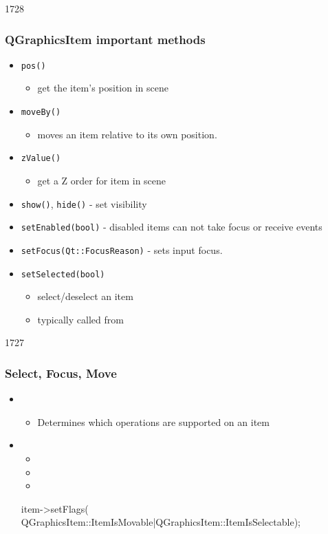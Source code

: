 \begin{slide}{1728}
\frametitle{QGraphicsItem important methods}
\begin{itemize}

\item \texttt{pos()}
    \begin{itemize}
    \item get the item's position in scene
    \end{itemize}
\item \texttt{moveBy()}
    \begin{itemize}
    \item moves an item relative to its own position. 
    \end{itemize}
\item \texttt{zValue()}
    \begin{itemize}
    \item get a Z order for item in scene
    \end{itemize}
           
\item \texttt{show()}, \texttt{hide()} - set visibility
\item \texttt{setEnabled(bool)} - disabled items can not take focus or receive events
\item \texttt{setFocus(Qt::FocusReason)} - sets input focus.
\item \texttt{setSelected(bool)}
    \begin{itemize}
    \item select/deselect an item
    \item typically called from 
    \end{itemize}
\end{itemize}
\end{slide} 
\begin{slide}[fragile]{1727}
\frametitle{Select, Focus, Move}
\begin{itemize}
\item {}
    \begin{itemize}
    \item Determines which operations are supported on an item
      
    \end{itemize}
\item {}
    \begin{itemize}
    \item {}
    \item {}
    \item {}
    \end{itemize}   
\begin{cpp}
item->setFlags(
  QGraphicsItem::ItemIsMovable|QGraphicsItem::ItemIsSelectable);
\end{cpp}
\end{itemize}

\end{slide}

